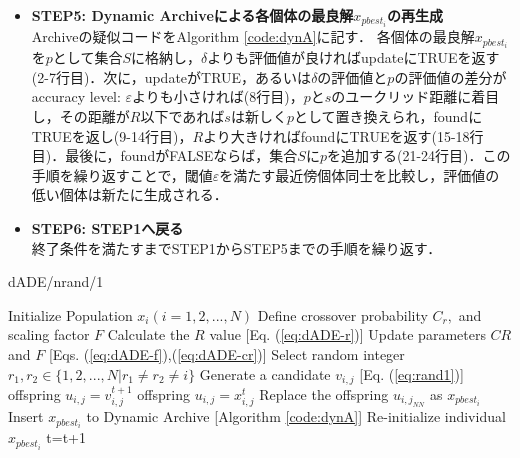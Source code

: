 \documentclass[a4j,11pt]{jarticle}
\begin{document}
\begin{itemize}
\item {\bf STEP5: Dynamic Archiveによる各個体の最良解$x_{pbest_i}$の再生成} \\
Archiveの疑似コードをAlgorithm \ref{code:dynA}に記す．
各個体の最良解$x_{pbest_i}$を$p$として集合$S$に格納し，$\delta$よりも評価値が良ければupdateにTRUEを返す(2-7行目)．次に，updateがTRUE，あるいは$\delta$の評価値と$p$の評価値の差分がaccuracy level: $\varepsilon$よりも小さければ(8行目)，$p$と$s$のユークリッド距離に着目し，その距離が$R$以下であれば$s$は新しく$p$として置き換えられ，foundにTRUEを返し(9-14行目)，$R$より大きければfoundにTRUEを返す(15-18行目)．最後に，foundがFALSEならば，集合$S$に$p$を追加する(21-24行目)．この手順を繰り返すことで，閾値$\varepsilon$を満たす最近傍個体同士を比較し，評価値の低い個体は新たに生成される．

\item {\bf STEP6: STEP1へ戻る} \\
終了条件を満たすまでSTEP1からSTEP5までの手順を繰り返す．

\end{itemize}

\begin{algorithm}[H]
\caption{dADE/nrand/1}
\label{code:dADE}
\begin{algorithmic}[3]
\STATE Initialize Population $x_i (i=1,2,...,N)$ 
\STATE Define crossover probability $C_r,$ and scaling factor $F$
\STATE Calculate the $R$ value [Eq. (\ref{eq:dADE-r})]
\STATE Update parameters $CR$ and $F$ [Eqs. (\ref{eq:dADE-f}),(\ref{eq:dADE-cr})]
\STATE Select random integer $r_1, r_2 \in \{ 1,2,..., N| r_1 \neq r_2 \neq i\}$
\STATE Generate a candidate $v_{i,j}$  [Eq. (\ref{eq:rand1})]
\STATE offspring $u_{i,j} = v_{i,j}^{t+1}$
\STATE offspring $u_{i,j} = x_{i,j}^t$
\ENDIF
\ENDFOR
{}
\STATE Replace the offspring $u_{{i,j}_{NN}}$ as $x_{pbest_i}$
\STATE Insert $x_{pbest_i}$ to Dynamic Archive [Algorithm \ref{code:dynA}]
\STATE Re-initialize individual $x_{pbest_i}$
\ENDIF
\ENDIF
\ENDFOR
\STATE t=t+1
\ENDWHILE
\end{algorithmic}
\end{algorithm}
\end{document}
